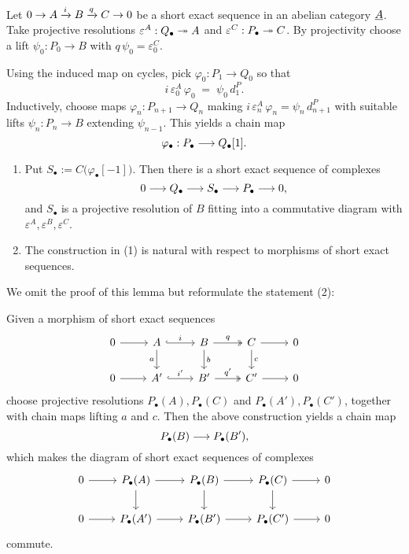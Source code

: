 Let \( 0 \to A \xrightarrow{i} B \xrightarrow{q} C \to 0 \) be a short exact sequence in an abelian category \( \underline{A} \). Take projective resolutions \( \varepsilon^A: Q_\bullet \twoheadrightarrow A \) and \( \varepsilon^C: P_\bullet \twoheadrightarrow C \). By projectivity choose a lift \( \psi_0: P_0 \to B \) with \( q\,\psi_0 = \varepsilon^C_0 \).

Using the induced map on cycles, pick \( \varphi_0: P_1 \to Q_0 \) so that
\[
	i\, \varepsilon^A_0\, \varphi_0 \;=\; \psi_0\, d^{P}_1.
\]
Inductively, choose maps \( \varphi_n: P_{n+1} \to Q_n \) making \( i\, \varepsilon^A_n\, \varphi_n = \psi_n\, d^{P}_{n+1} \) with suitable lifts \( \psi_n: P_n \to B \) extending \( \psi_{n-1} \). This yields a chain map
\[
	\varphi_\bullet: P_\bullet \longrightarrow Q_\bullet[1].
\]

\begin{lemma*}
	\mbox{}
	\begin{enumerate}
		\item Put \( S_\bullet := C\bigl(\varphi_\bullet[-1]\bigr) \). Then there is a short exact sequence of complexes
			\[
				0 \longrightarrow Q_\bullet \longrightarrow S_\bullet \longrightarrow P_\bullet \longrightarrow 0,
			\]
			and \( S_\bullet \) is a projective resolution of \( B \) fitting into a commutative diagram with \( \varepsilon^A,\varepsilon^B,\varepsilon^C \).
		\item The construction in (1) is natural with respect to morphisms of short exact sequences.
	\end{enumerate}
\end{lemma*}

We omit the proof of this lemma but reformulate the statement (2):

\begin{lemma*}
	Given a morphism of short exact sequences
	\[
		\begin{tikzcd}
			0 \arrow[r] & A \arrow[r,hook,"i"] \arrow[d,"a"'] & B \arrow[r,two heads,"q"] \arrow[d,"b"] & C \arrow[r] \arrow[d,"c"] & 0 \\
			0 \arrow[r] & A' \arrow[r,hook,"i'"] & B' \arrow[r,two heads,"q'"] & C' \arrow[r] & 0
		\end{tikzcd}
	\]
	choose projective resolutions \( P_\bullet(A), P_\bullet(C) \) and \( P_\bullet(A'), P_\bullet(C') \), together with chain maps lifting \( a \) and \( c \). Then the above construction yields a chain map
	\[
		P_\bullet(B) \longrightarrow P_\bullet(B'),
	\]
	which makes the diagram of short exact sequences of complexes
	\[
		\begin{tikzcd}
			0 \arrow[r] & P_\bullet(A) \arrow[r] \arrow[d] & P_\bullet(B) \arrow[r] \arrow[d] & P_\bullet(C) \arrow[r] \arrow[d] & 0 \\
			0 \arrow[r] & P_\bullet(A') \arrow[r] & P_\bullet(B') \arrow[r] & P_\bullet(C') \arrow[r] & 0
		\end{tikzcd}
	\]
	commute.
\end{lemma*}

